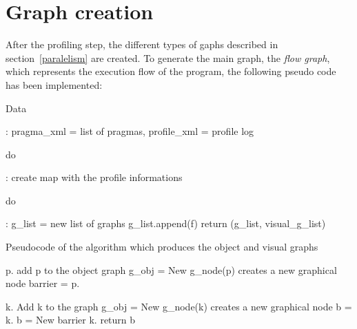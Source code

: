 \documentclass[a4paper,12pt,oneside]{book}
\begin{document}
\section{Graph creation}
\label{graph}

After the profiling step, the different types of gaphs described in section~\ref{paralelism} are created. To generate the main graph, the \emph{flow graph}, which represents the execution flow of the program, the following pseudo code has been implemented:

\begin{algorithm}
\begin{algorithmic}
\State \begin{bf}Data\end{bf}: pragma\_xml = list of pragmas, profile\_xml = profile log
\State \begin{bf}do\end{bf}: create map with the profile informations
\State \begin{bf}do\end{bf}: g\_list = new list of graphs
\State g\_list.append(f)  
\State {} 
\EndFor
\State return (g\_list, visual\_g\_list) 
\EndFunction
\end{algorithmic}
\caption{Pseudocode of the algorithm which produces the object and visual graphs}
\begin{algorithmic}
\State p.
\State add p to the object graph
\State g\_obj = New g\_node(p) \Comment creates a new graphical node
\State barrier = 
\State p.
\EndIf
\EndFor
\EndFunction
\end{algorithmic}

\begin{algorithmic}
\State k.
\State Add k to the graph
\State g\_obj = New g\_node(k) \Comment creates a new graphical node
\State b = 
\State k.
\Else 
\State b = New barrier
\State k.
\EndIf
\EndFor
\State return b
\EndFunction

\end{algorithmic}
\end{algorithm}
\end{document}
